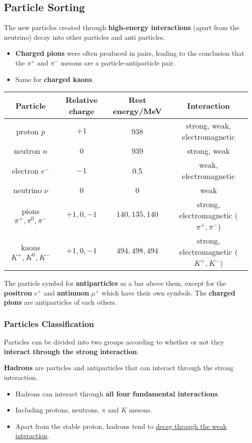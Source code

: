 \subsection{Particle Sorting}

The new particles created through \textbf{high-energy interactions} (apart from the neutrino) decay into other particles and anti particles.
\begin{itemize}
    \item \textbf{Charged pions} were often produced in pairs, leading to the conclusion that the $\pi^+$ and $\pi^-$ mesons are a particle-antiparticle pair.
    \item Same for \textbf{charged kaons}.
\end{itemize}

\begin{center}
    \begin{tabular}{|c|c|c|c|}
        \hline
        Particle & Relative charge & Rest energy/MeV & Interaction\\
        \hline
        proton $p$ & $+1$ & 938 & strong, weak, electromagnetic\\
        neutron $n$ & 0 & 939 & strong, weak\\
        electron $e^-$ & $-1$ & 0.5 & weak, electromagnetic\\
        neutrino $\nu$ & 0 & 0 & weak\\
        pions $\pi^+,\pi^0,\pi^-$ & $+1,0,-1$ & $140,135,140$ & strong, electromagnetic ($\pi^+,\pi^-$)\\
        kaons $K^+, K^0, K^-$ & $+1,0,-1$ & $494,498,494$ & strong, electromagnetic ($K^+,K^-$)\\
        \hline
    \end{tabular}
\end{center}

The particle symbol for \textbf{antiparticles} as a $\overline{\text{bar above them}}$, except for the \textbf{positron} $e^+$ and \textbf{antimuon} $\mu^+$ which have their own symbols. The \textbf{charged pions} are antiparticles of each others.

\subsubsection*{Particles Classification}

Particles can be divided into two groups according to whether or not they \textbf{interact through the strong interaction}.

\textbf{Hadrons} are particles and antiparticles that can interact through the strong interaction.
\begin{itemize}
    \item Hadrons can interact through \textbf{all four fundamental interactions}.
    \item Including protons, neutrons, $\pi$ and $K$ mesons.
    \item Apart from the stable proton, hadrons tend to \underline{decay through the weak interaction}.
\end{itemize}

